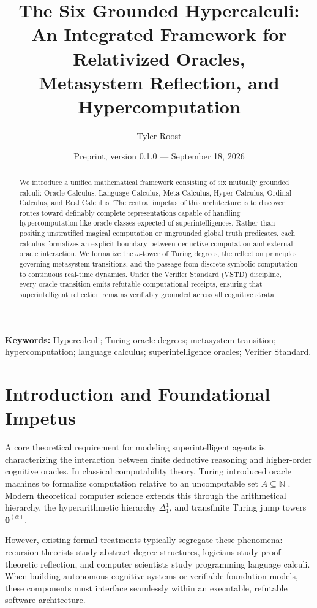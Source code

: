 \documentclass[11pt]{article}
\title{The Six Grounded Hypercalculi:\\An Integrated Framework for Relativized Oracles,\\Metasystem Reflection, and Hypercomputation}
\author{Tyler Roost}
\date{Preprint, version 0.1.0 --- September 18, 2026}
\theoremstyle{definition}
\newcommand{\N}{\mathbb N}
\begin{document}
\maketitle

\begin{abstract}
We introduce a unified mathematical framework consisting of six mutually grounded calculi: Oracle Calculus, Language Calculus, Meta Calculus, Hyper Calculus, Ordinal Calculus, and Real Calculus. The central impetus of this architecture is to discover routes toward definably complete representations capable of handling hypercomputation-like oracle classes expected of superintelligences. Rather than positing unstratified magical computation or ungrounded global truth predicates, each calculus formalizes an explicit boundary between deductive computation and external oracle interaction. We formalize the $\omega$-tower of Turing degrees, the reflection principles governing metasystem transitions, and the passage from discrete symbolic computation to continuous real-time dynamics. Under the Verifier Standard (VSTD) discipline, every oracle transition emits refutable computational receipts, ensuring that superintelligent reflection remains verifiably grounded across all cognitive strata.
\end{abstract}

\noindent\textbf{Keywords:} Hypercalculi; Turing oracle degrees; metasystem transition; hypercomputation; language calculus; superintelligence oracles; Verifier Standard.

\section{Introduction and Foundational Impetus}
A core theoretical requirement for modeling superintelligent agents is characterizing the interaction between finite deductive reasoning and higher-order cognitive oracles. In classical computability theory, Turing introduced oracle machines to formalize computation relative to an uncomputable set $A \subseteq \N$ \cite{turing}. Modern theoretical computer science extends this through the arithmetical hierarchy, the hyperarithmetic hierarchy $\Delta^1_1$, and transfinite Turing jump towers $\mathbf{0}^{(\alpha)}$.

However, existing formal treatments typically segregate these phenomena: recursion theorists study abstract degree structures, logicians study proof-theoretic reflection, and computer scientists study programming language calculi. When building autonomous cognitive systems or verifiable foundation models, these components must interface seamlessly within an executable, refutable software architecture.
\end{document}
